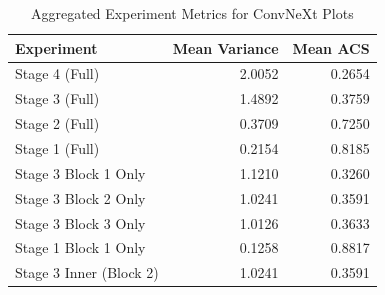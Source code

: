 \begin{table}
\caption{Aggregated Experiment Metrics for ConvNeXt Plots}
\label{tab:exp_plot_data_convnext}
\begin{tabular}{lrr}
\toprule
Experiment & Mean Variance & Mean ACS \\
\midrule
Stage 4 (Full) & 2.0052 & 0.2654 \\
Stage 3 (Full) & 1.4892 & 0.3759 \\
Stage 2 (Full) & 0.3709 & 0.7250 \\
Stage 1 (Full) & 0.2154 & 0.8185 \\
Stage 3 Block 1 Only & 1.1210 & 0.3260 \\
Stage 3 Block 2 Only & 1.0241 & 0.3591 \\
Stage 3 Block 3 Only & 1.0126 & 0.3633 \\
Stage 1 Block 1 Only & 0.1258 & 0.8817 \\
Stage 3 Inner (Block 2) & 1.0241 & 0.3591 \\
\bottomrule
\end{tabular}
\end{table}
